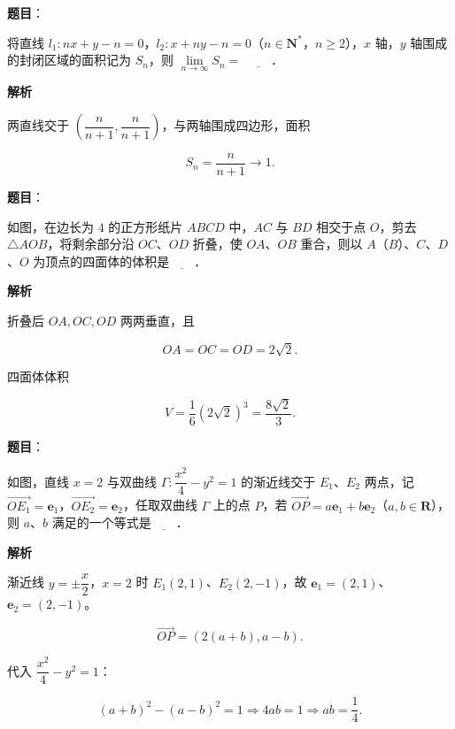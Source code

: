 \begin{answer}

\textbf{题目}：

将直线 $l_1:nx+y-n=0$，$l_2:x+ny-n=0$（$n\in\mathbf N^*$，$n\geqslant2$），$x$ 轴，$y$ 轴围成的封闭区域的面积记为 $S_n$，则 $\lim\limits_{n\to\infty}S_n=$ $\underline{\qquad}$．

\textbf{解析}

两直线交于 $\left(\dfrac n{n+1},\dfrac n{n+1}\right)$，与两轴围成四边形，面积

\nopagebreak[4]
\[S_n=\frac n{n+1}\to1.\]


\end{answer}
\begin{answer}

\textbf{题目}：

如图，在边长为 $4$ 的正方形纸片 $ABCD$ 中，$AC$ 与 $BD$ 相交于点 $O$，剪去 $\triangle AOB$，将剩余部分沿 $OC$、$OD$ 折叠，使 $OA$、$OB$ 重合，则以 $A$（$B$）、$C$、$D$、$O$ 为顶点的四面体的体积是$\underline{\qquad}$．
\nopagebreak[4]
\begin{center}\end{center}
\nopagebreak[4]
\textbf{解析}

折叠后 $OA,OC,OD$ 两两垂直，且

\nopagebreak[4]
\[OA=OC=OD=2\sqrt2.\]

四面体体积

\nopagebreak[4]
\[V=\frac16(2\sqrt2)^3=\frac{8\sqrt2}3.\]


\end{answer}
\begin{answer}

\textbf{题目}：

如图，直线 $x=2$ 与双曲线 $\Gamma:\dfrac{x^2}4-y^2=1$ 的渐近线交于 $E_1$、$E_2$ 两点，记 $\overrightarrow{OE_1}=\boldsymbol e_1$，$\overrightarrow{OE_2}=\boldsymbol e_2$，任取双曲线 $\Gamma$ 上的点 $P$，若 $\overrightarrow{OP}=a\boldsymbol e_1+b\boldsymbol e_2$（$a,b\in\mathbf R$），则 $a$、$b$ 满足的一个等式是$\underline{\qquad}$．
\nopagebreak[4]
\begin{center}\end{center}
\nopagebreak[4]
\textbf{解析}

渐近线 $y=\pm\dfrac x2$，$x=2$ 时 $E_1(2,1)$、$E_2(2,-1)$，故 $\boldsymbol e_1=(2,1)$、$\boldsymbol e_2=(2,-1)$。

\nopagebreak[4]
\[\overrightarrow{OP}=(2(a+b),a-b).\]

代入 $\dfrac{x^2}4-y^2=1$：

\nopagebreak[4]
\[(a+b)^2-(a-b)^2=1\Longrightarrow4ab=1\Longrightarrow ab=\frac14.\]


\end{answer}
